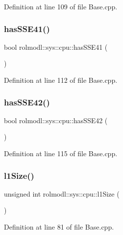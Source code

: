 Definition at line 109 of file Base.\+cpp.

\mbox{\label{namespacerolmodl_1_1sys_1_1cpu_a4ff9c70551b00e25009df29293b1a730}} 
\subsubsection{\texorpdfstring{hasSSE41()}{hasSSE41()}}
{\footnotesize\ttfamily bool rolmodl\+::sys\+::cpu\+::has\+S\+S\+E41 (\begin{DoxyParamCaption}{ }\end{DoxyParamCaption})\hspace{0.3cm}{\ttfamily [noexcept]}}



Definition at line 112 of file Base.\+cpp.

\mbox{\label{namespacerolmodl_1_1sys_1_1cpu_a65d1da04b578f34d55ec5470d315bce3}} 
\subsubsection{\texorpdfstring{hasSSE42()}{hasSSE42()}}
{\footnotesize\ttfamily bool rolmodl\+::sys\+::cpu\+::has\+S\+S\+E42 (\begin{DoxyParamCaption}{ }\end{DoxyParamCaption})\hspace{0.3cm}{\ttfamily [noexcept]}}



Definition at line 115 of file Base.\+cpp.

\mbox{\label{namespacerolmodl_1_1sys_1_1cpu_ad98e620f999f2f80c6eda9f191d3453e}} 
\subsubsection{\texorpdfstring{l1Size()}{l1Size()}}
{\footnotesize\ttfamily unsigned int rolmodl\+::sys\+::cpu\+::l1\+Size (\begin{DoxyParamCaption}{ }\end{DoxyParamCaption})\hspace{0.3cm}{\ttfamily [noexcept]}}



Definition at line 81 of file Base.\+cpp.

